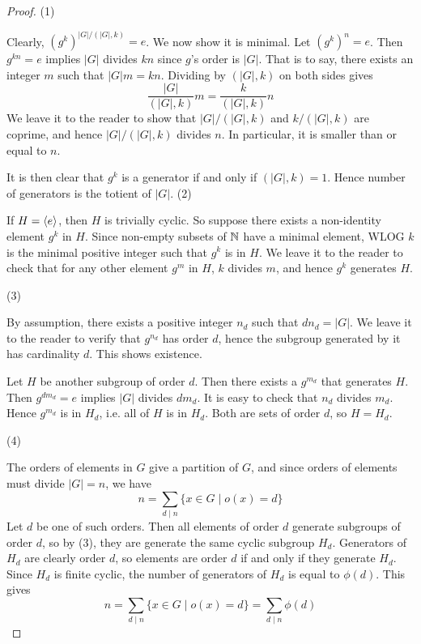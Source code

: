 \documentclass[../../book.tex]{subfiles}
\begin{document}
\begin{proof}
    (1)
    
        Clearly, $(g^k)^{|G|/(|G|,k)} = e$. 
        We now show it is minimal. 
        Let $(g^k)^n = e$. 
        Then $g^{kn} = e$ implies $|G|$ divides $kn$ since $g$'s order is $|G|$. 
        That is to say, there exists an integer $m$ such that $|G| m = k n$. 
        Dividing by $(|G|,k)$ on both sides gives \[
            \frac{|G|}{(|G|,k)} m = \frac{k}{(|G|,k)} n
        \]
        We leave it to the reader to show that 
        $|G| / (|G|,k)$ and $k / (|G|, k)$ are coprime, 
        and hence $|G| / (|G|,k)$ divides $n$. 
        In particular, it is smaller than or equal to $n$.
        
        It is then clear that $g^k$ is a generator if and only if $(|G|,k) = 1$.
        Hence number of generators is the totient of $|G|$. 
    (2)
        
        If $H = \langle e\rangle$, then $H$ is trivially cyclic.
        So suppose there exists a non-identity element $g^k$ in $H$.
        Since non-empty subsets of $\mathbb{N}$ have a minimal element, 
        WLOG $k$ is the minimal positive integer such that $g^k$ is in $H$.
        We leave it to the reader to check that for any other element $g^m$ in $H$,
        $k$ divides $m$, and hence $g^k$ generates $H$. 
    
    (3)
        
        By assumption, there exists a positive integer $n_d$ such that $d n_d = |G|$.
        We leave it to the reader to verify that $g^{n_d}$ has order $d$,
        hence the subgroup generated by it has cardinality $d$. 
        This shows existence. 
        
        Let $H$ be another subgroup of order $d$. 
        Then there exists a $g^{m_d}$ that generates $H$. 
        Then $g^{dm_d} = e$ implies $|G|$ divides $dm_d$. 
        It is easy to check that $n_d$ divides $m_d$.
        Hence $g^{m_d}$ is in $H_d$, i.e. all of $H$ is in $H_d$. 
        Both are sets of order $d$, so $H = H_d$.
        
    (4)
        
        The orders of elements in $G$ give a partition of $G$,
        and since orders of elements must divide $|G| = n$, we have \[
            n = \sum_{d \mid n} \{x \in G \mid o(x) = d\}
        \]
        Let $d$ be one of such orders. 
        Then all elements of order $d$ generate subgroups of order $d$,
        so by (3), they are generate the same cyclic subgroup $H_d$. 
        Generators of $H_d$ are clearly order $d$, 
        so elements are order $d$ if and only if they generate $H_d$.
        Since $H_d$ is finite cyclic, 
        the number of generators of $H_d$ is equal to $\phi(d)$. 
        This gives \[
            n = \sum_{d \mid n} \{x \in G \mid o(x) = d\} = \sum_{d \mid n} \phi(d)
        \]
    
\end{proof}
\end{document}

